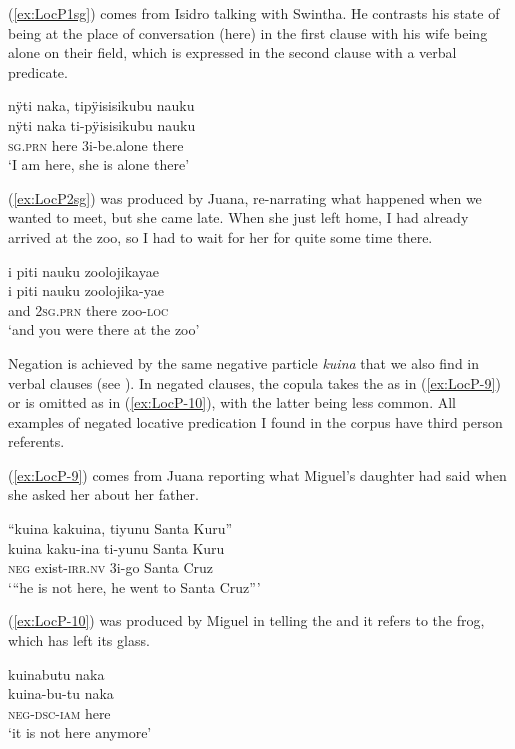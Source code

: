(\ref{ex:LocP1sg}) comes from Isidro talking with Swintha. He contrasts his state of being at the place of conversation (here) in the first clause with his wife being alone on their field, which is expressed in the second clause with a verbal predicate.

\ea\label{ex:LocP1sg}
\begingl 
\glpreamble nÿti naka, tipÿisisikubu nauku\\
\gla nÿti naka ti-pÿisisikubu nauku\\ 
\textsc{sg.prn} here 3i-be.alone there\\ 
\glft ‘I am here, she is alone there’
\trailingcitation{[dxx-d120416s.167]}
\xe

(\ref{ex:LocP2sg}) was produced by Juana, re-narrating what happened when we wanted to meet, but she came late. When she just left home, I had already arrived at the zoo, so I had to wait for her for quite some time there.

\ea\label{ex:LocP2sg}
\begingl 
\glpreamble i piti nauku zoolojikayae\\
\gla i piti nauku zoolojika-yae\\ 
\glb and 2\textsc{sg.prn} there zoo-\textsc{loc}\\ 
\glft ‘and you were there at the zoo’
\trailingcitation{[jxx-p110923l-2.044]}
\xe

Negation is achieved by the same negative particle \textit{kuina} that we also find in verbal clauses (see ). In negated clauses, the copula takes the  as in (\ref{ex:LocP-9}) or is omitted as in (\ref{ex:LocP-10}), with the latter being less common. All examples of negated locative predication I found in the corpus have third person referents.

(\ref{ex:LocP-9}) comes from Juana reporting what Miguel’s daughter had said when she asked her about her father.

\ea\label{ex:LocP-9}
\begingl
\glpreamble “kuina kakuina, tiyunu Santa Kuru”\\
\gla kuina kaku-ina ti-yunu {Santa Kuru}\\
\glb \textsc{neg} exist-\textsc{irr.nv} 3i-go {Santa Cruz}\\
\glft ‘“he is not here, he went to Santa Cruz”'
\endgl
\trailingcitation{[jxx-e150925l-1.126]}
\xe

(\ref{ex:LocP-10}) was produced by Miguel in telling the  and it refers to the frog, which has left its glass.

\ea\label{ex:LocP-10}
\begingl
\glpreamble kuinabutu naka\\
\gla kuina-bu-tu naka\\
\glb \textsc{neg}-\textsc{dsc}-\textsc{iam} here\\
\glft ‘it is not here anymore’
\endgl
\trailingcitation{[mox-a110920l-2.039]}
\xe
{}

